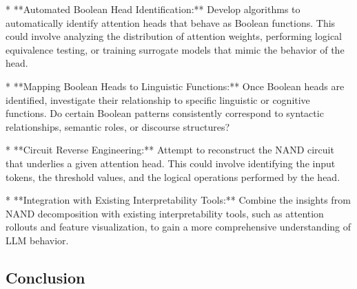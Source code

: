 *   **Automated Boolean Head Identification:** Develop algorithms to automatically identify attention heads that behave as Boolean functions. This could involve analyzing the distribution of attention weights, performing logical equivalence testing, or training surrogate models that mimic the behavior of the head.






*   **Mapping Boolean Heads to Linguistic Functions:** Once Boolean heads are identified, investigate their relationship to specific linguistic or cognitive functions. Do certain Boolean patterns consistently correspond to syntactic relationships, semantic roles, or discourse structures?






*   **Circuit Reverse Engineering:**  Attempt to reconstruct the NAND circuit that underlies a given attention head. This could involve identifying the input tokens, the threshold values, and the logical operations performed by the head.






*   **Integration with Existing Interpretability Tools:**  Combine the insights from NAND decomposition with existing interpretability tools, such as attention rollouts and feature visualization, to gain a more comprehensive understanding of LLM behavior.













\subsection{Conclusion}













